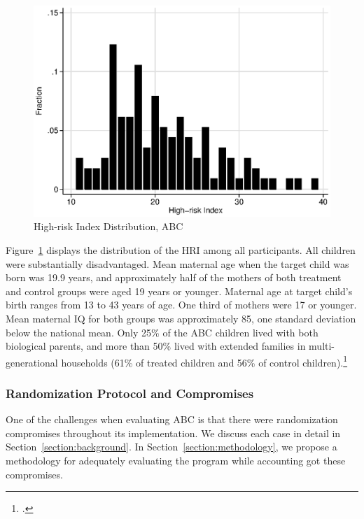 \begin{center}
	\begin{figure}[H]
		\caption{High-risk Index Distribution, ABC} \label{figure:hridistabc}
		\centering
		\includegraphics[width=.9\columnwidth]{output/abc_hri.eps}
	\end{figure}
\end{center}

\noindent Figure~\ref{figure:hridistabc} displays the distribution of the HRI among all participants. All children were substantially disadvantaged. Mean maternal age when the target child was born was 19.9 years, and approximately half of the mothers of both treatment and control groups were aged 19 years or younger. Maternal age at target child's birth ranges from 13 to 43 years of age. One third of mothers were 17 or younger. Mean maternal IQ for both groups was approximately 85, one standard deviation below the national mean. Only 25\% of the ABC children lived with both biological parents, and more than 50\% lived with extended families in multi-generational households (61\% of treated children and 56\% of control children).\footnote{\citet{Ramey_Campbell_1991_childreninpoverty,Campbell_Ramey_1994_CD}.}\\

\subsubsection{Randomization Protocol and Compromises}

\noindent One of the challenges when evaluating ABC is that there were randomization compromises throughout its implementation. We discuss each case in detail in Section~\ref{section:background}. In Section~\ref{section:methodology},  we propose a methodology for adequately evaluating the program while accounting got these compromises.

